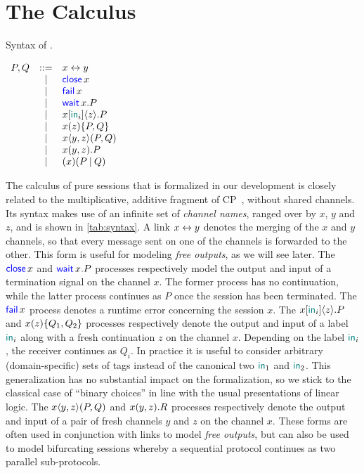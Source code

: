 \section{The Calculus}
\label{sec:calculus}

\begin{table}
    \caption{Syntax of \Calculus.}
    \label{tab:syntax}
    \begin{math}
        \displaystyle
        \begin{array}[t]{rcll}
            P, Q & ::= & \Link\x\y \\
                & | & \Close\x \\
                & | & \Fail\x \\
                & | & \Wait\x.P \\
                & | & \Select\x{\InTag_i}\z.P \\
                & | & \Case\x\z{P}{Q} \\
                & | & \Fork\x\y\z{P}{Q} \\
                & | & \Join\x\y\z.P \\
                & | & \Cut\x{P}{Q} \\
        \end{array}
    \end{math}
\end{table}

The calculus of pure sessions that is formalized in our development is closely
related to the multiplicative, additive fragment of CP~\citep{Wadler14}, without
shared channels. Its syntax makes use of an infinite set of \emph{channel
names}, ranged over by $x$, $y$ and $z$, and is shown in \cref{tab:syntax}.
%
A link $x\leftrightarrow y$ denotes the merging of the $x$ and $y$ channels, so that
every message sent on one of the channels is forwarded to the other. This form
is useful for modeling \emph{free outputs}, as we will see later.
%
The $\mathsf{\color{blue}close}\,x$ and $\mathsf{\color{blue}wait}\,x.P$ processes respectively model the output and input of a termination signal on the channel $x$. The former process has no continuation, while the latter process continues as $P$ once the session has been terminated.
%
The $\mathsf{\color{blue}fail}\,x$ process denotes a runtime error concerning the session $x$.
%
The $\Select\x{\InTag_i}\z.P$ and $\Case\x\z{Q_1}{Q_2}$ processes respectively
denote the output and input of a label $\mathsf{\color{teal}in}_i$ along with a fresh
continuation $z$ on the channel $x$. Depending on the label $\mathsf{\color{teal}in}_i$, the
receiver continues as $Q_i$. In practice it is useful to consider arbitrary
(domain-specific) sets of tags instead of the canonical two $\mathsf{\color{teal}in}_1$ and
$\mathsf{\color{teal}in}_2$. This generalization has no substantial impact on the formalization,
so we stick to the classical case of ``binary choices'' in line with the usual
presentations of linear logic.
%
The $\Fork\x\y\z{P}{Q}$ and $\Join\x\y\z.R$ processes respectively denote the
output and input of a pair of fresh channels $y$ and $z$ on the channel $x$.
These forms are often used in conjunction with links to model \emph{free
outputs}, but can also be used to model bifurcating sessions whereby a
sequential protocol continues as two parallel sub-protocols.

